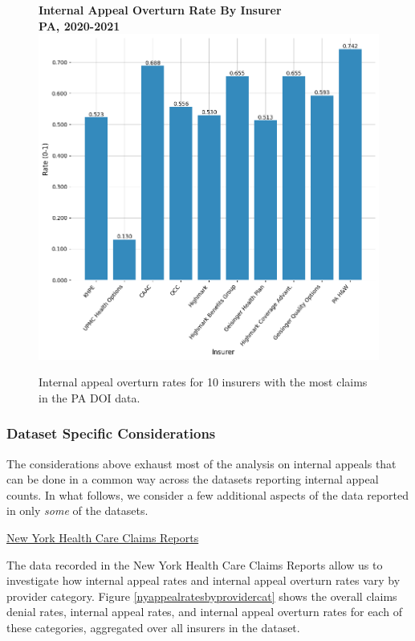 \documentclass[12pt, a4paper,twoside,parskip=full]{report}
\theoremstyle{plain} %
\theoremstyle{definition} %
\theoremstyle{remark} %
\numberwithin{equation}{chapter}
\begin{document}
		
		\begin{figure}[h!]
			\centering
			\textbf{Internal Appeal Overturn Rate By Insurer}\\
			\textbf{PA, 2020-2021}\\
			\includegraphics[width=.8\columnwidth]{images/pa_claims/internal_appeal_overturn_rate_by_insurer.png}
			\caption{Internal appeal overturn rates for 10 insurers with the most claims in the PA DOI data.}
			\label{painternalappealoverturnratebyinsurer}
		\end{figure}
		
		\clearpage
		
		\subsubsection{Dataset Specific Considerations}
		
		The considerations above exhaust most of the analysis on internal appeals that can be done in a common way across the datasets reporting internal appeal counts. In what follows, we consider a few additional aspects of the data reported in only \emph{some} of the datasets.
		
		\underline{New York Health Care Claims Reports}
		
		The data recorded in the New York Health Care Claims Reports allow us to investigate how internal appeal rates and internal appeal overturn rates vary by provider category. Figure \ref{nyappealratesbyprovidercat} shows the overall claims denial rates, internal appeal rates, and internal appeal overturn rates for each of these categories, aggregated over all insurers in the dataset.
		
\end{document}
